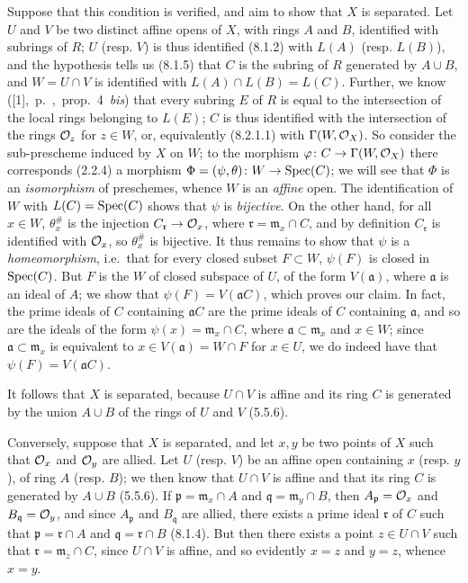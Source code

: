 \documentclass[../main.tex]{subfiles}
\begin{document}
Suppose that this condition is verified, and aim to show that $X$ is separated.
Let $U$ and $V$ be two distinct affine opens of $X$, with rings $A$ and $B$, identified with subrings of $R$; $U$ (resp. $V$) is thus identified (8.1.2) with $L(A)$ (resp. $L(B)$), and the hypothesis tells us (8.1.5) that $C$ is the subring of $R$ generated by $A\cup B$, and $W=U\cap V$ is identified with $L(A)\cap L(B)=L(C)$.
Further, we know ([1],~p.~,~prop.~4~\emph{bis}) that every subring $E$ of $R$ is equal to the intersection of the local rings belonging to $L(E)$; $C$ is thus identified with the intersection of the rings $\mathcal{O}_z$ for $z\in W$, or, equivalently (8.2.1.1) with $\Gamma(W,\mathcal{O}_X)$.
So consider the sub-prescheme induced by $X$ on $W$; to the  morphism $\varphi\colon C\to\Gamma(W,\mathcal{O}_X)$ there corresponds (2.2.4) a morphism $\Phi=(\psi,\theta)\colon W\to\operatorname*{Spec}(C)$; we will see that $\Phi$ is an \emph{isomorphism} of preschemes, whence $W$ is an \emph{affine} open.
The identification of $W$ with $L(C)=\operatorname*{Spec}(C)$ shows that $\psi$ is \emph{bijective}.
On the other hand, for all $x\in W$, $\theta_x^\#$ is the injection $C_\mathfrak{r}\to\mathcal{O}_x$, where $\mathfrak{r}=\mathfrak{m}_x\cap C$, and by definition $C_\mathfrak{r}$ is identified with $\mathcal{O}_x$, so $\theta_x^\#$ is bijective.
It thus remains to show that $\psi$ is a \emph{homeomorphism}, i.e.\ that for every closed subset $F\subset W$, $\psi(F)$ is closed in $\operatorname*{Spec}(C)$.
But $F$ is the  $W$ of closed subspace of $U$, of the form $V(\mathfrak{a})$, where $\mathfrak{a}$ is an ideal of $A$; we show that $\psi(F)=V(\mathfrak{a}C)$, which proves our claim.
In fact, the prime ideals of $C$ containing $\mathfrak{a}C$ are the prime ideals of $C$ containing $\mathfrak{a}$, and so are the ideals of the form $\psi(x)=\mathfrak{m}_x\cap C$, where $\mathfrak{a}\subset\mathfrak{m}_x$ and $x\in W$; since $\mathfrak{a}\subset\mathfrak{m}_x$ is equivalent to $x\in V(\mathfrak{a})=W\cap F$ for $x\in U$, we do indeed have that $\psi(F)=V(\mathfrak{a}C)$.

It follows that $X$ is separated, because $U\cap V$ is affine and its ring $C$ is generated by the union $A\cup B$ of the rings of $U$ and $V$ (5.5.6).

Conversely, suppose that $X$ is separated, and let $x,y$ be two points of $X$ such that $\mathcal{O}_x$ and $\mathcal{O}_y$ are allied.
Let $U$ (resp. $V$) be an affine open containing $x$ (resp. $y$), of ring $A$ (resp. $B$); we then know that $U\cap V$ is affine and that its ring $C$ is generated by $A\cup B$ (5.5.6).
If $\mathfrak{p}=\mathfrak{m}_x\cap A$ and $\mathfrak{q}=\mathfrak{m}_y\cap B$, then $A_\mathfrak{p}=\mathcal{O}_x$ and $B_\mathfrak{q}=\mathcal{O}_y$, and since $A_\mathfrak{p}$ and $B_\mathfrak{q}$ are allied, there exists a prime ideal $\mathfrak{r}$ of $C$ such that $\mathfrak{p}=\mathfrak{r}\cap A$ and $\mathfrak{q}=\mathfrak{r}\cap B$ (8.1.4).
But then there exists a point $z\in U\cap V$ such that $\mathfrak{r}=\mathfrak{m}_z\cap C$, since $U\cap V$ is affine, and so evidently $x=z$ and $y=z$, whence $x=y$.
\end{document}
